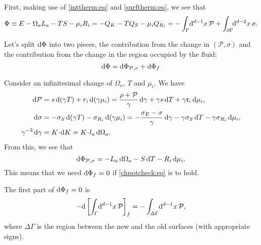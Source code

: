 \documentclass[12pt]{article}
\newcommand{\ploc}{\mathcal{P}}
\newcommand{\rl}{\mathfrak{r}}
\newcommand{\mg}{\mu}
\newcommand{\vint}{\int_\Gamma\!\dr^{d-1}x}
\newcommand{\aint}{\int_{\p\Gamma}\!\!\dr^{d-2}x}
\newcommand{\dvint}{\int_{\Delta\Gamma}\!\dr^{d-1}x}
\begin{document}
First, making use of \eqref{inttherm:eq} and \eqref{surftherm:eq}, we see that
%
\begin{equation}\label{thermpot:eq}
  \Phi \equiv E -\Omega_a L_a - T S - \mg_i R_i = -Q_K - T Q_S - \mg_i Q_{R_i}
   = - \vint\,\ploc + \aint\,\sigma.
\end{equation}
%

Let's split $\mathrm{d}\Phi$ into two pieces, the contribution from the change in $(\ploc,\sigma)$ and the contribution from  the change in the region occupied by the fluid:
%
\begin{equation*}
  \dr\Phi = \dr\Phi_{\ploc,\sigma} + \dr\Phi_f
\end{equation*}
%

Consider an infinitesimal change of $\Omega_a$, $T$ and $\mg_i$. We have
%
\begin{equation*}
\begin{split}
  \dr \ploc &= s\,\dr(\gamma T) + r_i\,\dr(\gamma\mg_i) = \frac{\rho+\ploc}{\gamma}\,\dr\gamma + \gamma s\,\dr T +\gamma  \rl_i\,\dr\mg_i,\\
  \dr \sigma &= -\sigma_S\,\dr(\gamma T) - \sigma_{R_i}\,\dr(\gamma\mg_i) = -\frac{\sigma_E-\sigma}{\gamma}\,\dr\gamma - \gamma \sigma_S\,\dr T -\gamma \sigma_{R_i}\,\dr\mg_i,\\
  \gamma^{-3}\,\dr\gamma &= K\cdt\dr K = K\cdt l_a \,\dr\Omega_a.
\end{split}
\end{equation*}
%
From this, we see that
%
\begin{equation*}
  \dr\Phi_{\ploc,\sigma} = - L_a \,\dr \Omega_a - S \,\dr T - R_i \,\dr \mg_i.
\end{equation*}
%
This means that we need $\mathrm{d}\Phi_f=0$ if \eqref{chpotcheck:eq} is to hold.

The first part of $\mathrm{d}\Phi_f=0$ is
%
\begin{equation*}
  -\dr\brk{\vint\,\ploc}_f = -\dvint\,\ploc,
\end{equation*}
%
where $\Delta\Gamma$ is the region between the new and the old surfaces (with appropriate signs). 
\end{document}
